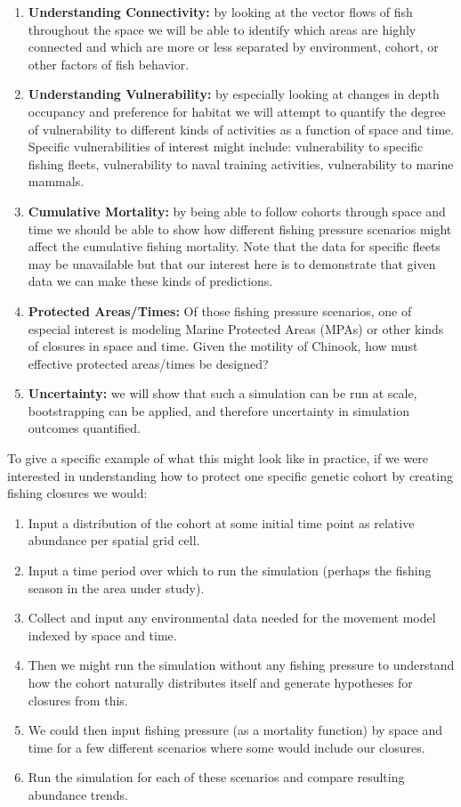 \documentclass[11pt]{article}
\begin{document}
\begin{enumerate}
\item \textbf{Understanding Connectivity:} by looking at the vector flows of fish throughout the space we will be able to identify which areas are highly connected and which are more or less separated by environment, cohort, or other factors of fish behavior.
\item \textbf{Understanding Vulnerability:} by especially looking at changes in depth occupancy and preference for habitat we will attempt to quantify the degree of vulnerability to different kinds of activities as a function of space and time. Specific vulnerabilities of interest might include: vulnerability to specific fishing fleets, vulnerability to naval training activities, vulnerability to marine mammals. 
\item \textbf{Cumulative Mortality:} by being able to follow cohorts through space and time we should be able to show how different fishing pressure scenarios might affect the cumulative fishing mortality. Note that the data for specific fleets may be unavailable but that our interest here is to demonstrate that given data we can make these kinds of predictions.  
\item \textbf{Protected Areas/Times:} Of those fishing pressure scenarios, one of especial interest is modeling Marine Protected Areas (MPAs) or other kinds of closures in space and time. Given the motility of Chinook, how must effective protected areas/times be designed? 
\item \textbf{Uncertainty:} we will show that such a simulation can be run at scale, bootstrapping can be applied, and therefore uncertainty in simulation outcomes quantified. 
\end{enumerate}

To give a specific example of what this might look like in practice, if we were interested in understanding how to protect one specific genetic cohort by creating fishing closures we would:

\begin{enumerate}
\item Input a distribution of the cohort at some initial time point as relative abundance per spatial grid cell.
\item Input a time period over which to run the simulation (perhaps the fishing season in the area under study).
\item Collect and input any environmental data needed for the movement model indexed by space and time.
\item Then we might run the simulation without any fishing pressure to understand how the cohort naturally distributes itself and generate hypotheses for closures from this.
\item We could then input fishing pressure (as a mortality function) by space and time for a few different scenarios where some would include our closures.
\item Run the simulation for each of these scenarios and compare resulting abundance trends. 
\end{enumerate}
\end{document}
